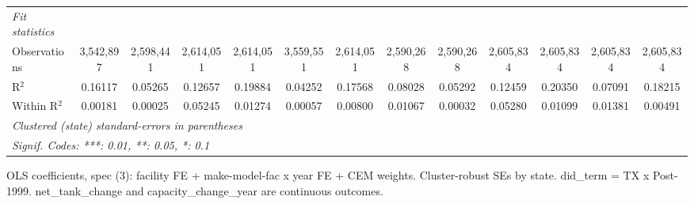 \begin{tabular}{lcccccccccccc}
   \midrule
   \emph{Fit statistics}\\
   Observations                    & 3,542,897           & 2,598,441                & 2,614,051       & 2,614,051    & 3,559,551                   & 2,614,051                          & 2,590,268           & 2,590,268                & 2,605,834       & 2,605,834    & 2,605,834                   & 2,605,834\\  
   R$^2$                           & 0.16117             & 0.05265                  & 0.12657         & 0.19884      & 0.04252                     & 0.17568                            & 0.08028             & 0.05292                  & 0.12459         & 0.20350      & 0.07091                     & 0.18215\\  
   Within R$^2$                    & 0.00181             & 0.00025                  & 0.05245         & 0.01274      & 0.00057                     & 0.00800                            & 0.01067             & 0.00032                  & 0.05280         & 0.01099      & 0.01381                     & 0.00491\\  
   \midrule \midrule
   \multicolumn{13}{l}{\emph{Clustered (state) standard-errors in parentheses}}\\
   \multicolumn{13}{l}{\emph{Signif. Codes: ***: 0.01, **: 0.05, *: 0.1}}\\
\end{tabular}
 
\par \raggedright 
OLS coefficients, spec (3): facility FE + make-model-fac x year FE + CEM weights. Cluster-robust SEs by state. did\_term = TX x Post-1999. net\_tank\_change and capacity\_change\_year are continuous outcomes.
\par\endgroup


